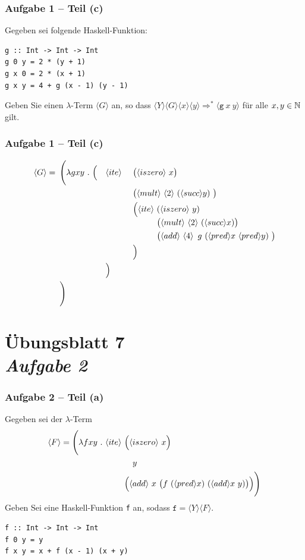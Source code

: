 \documentclass{beamer}
\newcommand{\num}[1]{\ensuremath{\langle #1 \rangle}}
\begin{document}
\begin{frame}[fragile] \frametitle{Aufgabe 1 -- Teil (c)}
	\small
	Gegeben sei folgende Haskell-Funktion:
	\begin{lstlisting}[style=bg]
g :: Int -> Int -> Int
g 0 y = 2 * (y + 1)
g x 0 = 2 * (x + 1)
g x y = 4 + g (x - 1) (y - 1)
	\end{lstlisting}

	Geben Sie einen $\lambda$-Term $\num{G}$ an, so dass $\num{Y} \num{G} \num{x} \num{y} \Rightarrow^\ast \num{\texttt{g} \ x \ y}$ für alle $x, y \in \mathbb{N}$ gilt.
\end{frame}

\begin{frame} \frametitle{Aufgabe 1 -- Teil (c)}
	\small
	\begin{alignat*}{3}
		\num{G} = \enskip & \Biggl( \lambda g xy \ . \ \Bigl( &&\num{ite} \ && \bigl( \num{iszero} \ x \bigr) \\
		&&&&& \bigl( \num{mult} \ \num{2} \ (\num{succ} y) \ \bigr) \\
		&&&&& \Bigl( 
			\begin{alignedat}[t]{1}
			\num{ite} \ &(\num{iszero} \ y) \\
			& \bigl( \num{mult} \ \num{2} \ (\num{succ} x) \bigr) \\
			& \bigl( \num{add} \ \num{4} \enskip g \ (\num{pred} x \ \num{pred} y)  \ \bigr) \\				
		\end{alignedat} \\
		&&&&& \Bigr) \\
		&&& \Bigr) \\
		& \Biggr)
	\end{alignat*}
\end{frame}

\section{Übungsblatt 7 \\ \textit{\normalsize Aufgabe 2}}

\begin{frame}[fragile] \frametitle{Aufgabe 2 -- Teil (a)}
	\small
	Gegeben sei der $\lambda$-Term 
	\begin{align*}
		\num{F} = \Biggl( \lambda f xy \ . \ \num{ite} \ &\Bigl(\num{iszero} \ x \Bigr) \\ & \quad y  \\
		&\Bigl( \num{add} \ x \ \big( f \ (\num{pred} x) \ (\num{add} x \ y) \big) \Bigr) \Biggr)
	\end{align*}
	Geben Sei eine Haskell-Funktion \texttt{f} an, sodass $\texttt{f} = \num{Y} \num{F}$.
	
	\medskip \pause
	
	\begin{lstlisting}[style=bg]
f :: Int -> Int -> Int
f 0 y = y
f x y = x + f (x - 1) (x + y)
	\end{lstlisting}
\end{frame}
\end{document}
